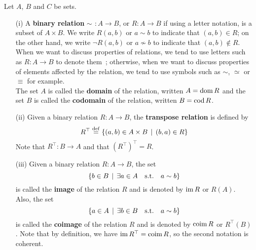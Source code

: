 \begin{definition} \label{binary-relations}
	Let $A$, $B$ and $C$ be sets.
	\\

	\begin{itemize}
		\item[(i)] A \textbf{binary relation} $\sim\,~: A \to B$, or $R : A \to B$ if using a letter notation, is a subset of $A \times B$. We write $R(a,b)$ or $a \sim b$ to indicate that $(a,b) \in R$; on the other hand, we write $\neg R(a,b)$ or $a\not \sim b$ to indicate that $(a,b) \notin R$. 
		\\
		
		When we want to discuss properties of relations, we tend to use letters such as $R : A \to B$ to denote them~; otherwise, when we want to discuss properties of elements affected by the relation, we tend to use symbols such as $\sim$, $\simeq$ or $\equiv$ for example.
		\\

		The set $A$ is called the \textbf{domain} of the relation, written $A = \operatorname{\mathrm{dom}} R$ and the set $B$ is called the \textbf{codomain} of the relation, written $B = \operatorname{\mathrm{cod}} R$. 
		\\

		\item[(ii)] Given a binary relation $R: A \to B$, the \textbf{transpose relation} is defined by 
		\[
				R^{\top} \overset{\mathrm{def}}{=} \{ (a,b) \in A \times B \, \mid \, (b,a) \in R \}
		\]
		Note that $R^{\top} : B \to A$ and that $(R^{\top})^{\top} = R$.
		\\

		\item[(iii)] Given a binary relation $R: A \to B$, the set
		\[
			\{ b \in B \, \mid \, \exists a \in A \quad \text{s.t.} \quad a \sim b \}
		\]
		is called the \textbf{image} of the relation $R$ and is denoted by $\operatorname{\mathrm{im}} R$ or $R(A)$. Also, the set
		\[
			\{ a \in A \, \mid \, \exists b \in B \quad \text{s.t.} \quad a \sim b \}
		\]
		is called the \textbf{coimage} of the relation $R$ and is denoted by $\operatorname{\mathrm{coim}} R$ or $R^{\top}(B)$. Note that by definition, we have $\operatorname{\mathrm{im}} R^{\top} = \operatorname{\mathrm{coim}} R$, so the second notation is coherent.
		\\
		

\end{itemize}
\end{definition}
